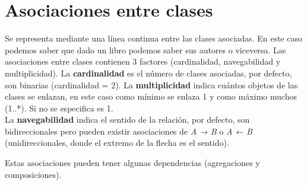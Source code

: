 \chapter{Asociaciones entre clases}

Se representa mediante una línea continua entre las clases asociadas.\vspace*{0.2cm}
En este caso podemos saber que dado un libro podemos saber sus autores o viceversa.
Las asociaciones entre clases contienen 3 factores (cardinalidad, navegabilidad y multiplicidad).\vspace*{0.2cm}
La \textbf{cardinalidad} es el número de clases asociadas, por defecto, son binarias (cardinalidad = 2).\vspace*{0.2cm}
La \textbf{multiplicidad} indica cuántos objetos de las clases se enlazan, en este caso como mínimo se enlaza 1 y como máximo muchos (1..*). Si no se especifica es 1.\\
La \textbf{navegabilidad} indica el sentido de la relación, por defecto, son bidireccionales pero pueden existir asociaciones de \textit{A → B} o \textit{A ← B} (unidireccionales, donde el extremo de la flecha es el sentido).\vspace*{0.2cm}

Estas asociaciones pueden tener algunas dependencias (agregaciones y composiciones).

